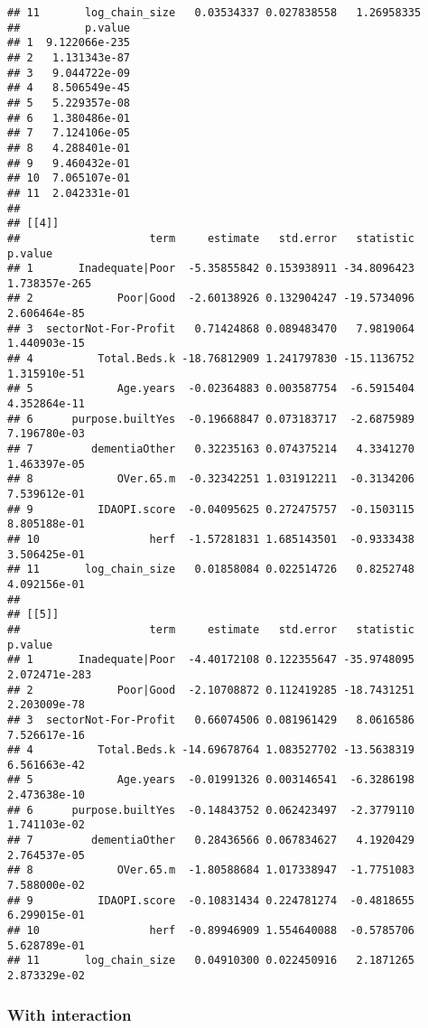 \documentclass[]{article}
\begin{document}
\begin{verbatim}
## 11       log_chain_size   0.03534337 0.027838558   1.26958335
##          p.value
## 1  9.122066e-235
## 2   1.131343e-87
## 3   9.044722e-09
## 4   8.506549e-45
## 5   5.229357e-08
## 6   1.380486e-01
## 7   7.124106e-05
## 8   4.288401e-01
## 9   9.460432e-01
## 10  7.065107e-01
## 11  2.042331e-01
## 
## [[4]]
##                    term     estimate   std.error   statistic       p.value
## 1       Inadequate|Poor  -5.35855842 0.153938911 -34.8096423 1.738357e-265
## 2             Poor|Good  -2.60138926 0.132904247 -19.5734096  2.606464e-85
## 3  sectorNot-For-Profit   0.71424868 0.089483470   7.9819064  1.440903e-15
## 4          Total.Beds.k -18.76812909 1.241797830 -15.1136752  1.315910e-51
## 5             Age.years  -0.02364883 0.003587754  -6.5915404  4.352864e-11
## 6      purpose.builtYes  -0.19668847 0.073183717  -2.6875989  7.196780e-03
## 7         dementiaOther   0.32235163 0.074375214   4.3341270  1.463397e-05
## 8             OVer.65.m  -0.32342251 1.031912211  -0.3134206  7.539612e-01
## 9          IDAOPI.score  -0.04095625 0.272475757  -0.1503115  8.805188e-01
## 10                 herf  -1.57281831 1.685143501  -0.9333438  3.506425e-01
## 11       log_chain_size   0.01858084 0.022514726   0.8252748  4.092156e-01
## 
## [[5]]
##                    term     estimate   std.error   statistic       p.value
## 1       Inadequate|Poor  -4.40172108 0.122355647 -35.9748095 2.072471e-283
## 2             Poor|Good  -2.10708872 0.112419285 -18.7431251  2.203009e-78
## 3  sectorNot-For-Profit   0.66074506 0.081961429   8.0616586  7.526617e-16
## 4          Total.Beds.k -14.69678764 1.083527702 -13.5638319  6.561663e-42
## 5             Age.years  -0.01991326 0.003146541  -6.3286198  2.473638e-10
## 6      purpose.builtYes  -0.14843752 0.062423497  -2.3779110  1.741103e-02
## 7         dementiaOther   0.28436566 0.067834627   4.1920429  2.764537e-05
## 8             OVer.65.m  -1.80588684 1.017338947  -1.7751083  7.588000e-02
## 9          IDAOPI.score  -0.10831434 0.224781274  -0.4818655  6.299015e-01
## 10                 herf  -0.89946909 1.554640088  -0.5785706  5.628789e-01
## 11       log_chain_size   0.04910300 0.022450916   2.1871265  2.873329e-02
\end{verbatim}

\subsubsection{With interaction}\label{with-interaction-1}
\end{document}
